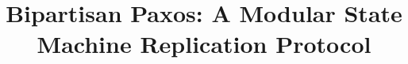 \documentclass[letterpaper,twocolumn,10pt]{article}
\begin{document}
\date{}

\title{Bipartisan Paxos: A Modular State Machine Replication Protocol}


\maketitle

{}
{}
{}
{}
{}
{}
{}
{}
{}




\appendix
{}
\end{document}
